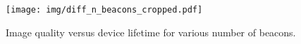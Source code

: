 \begin{figure}[!htb]
		\vspace{-1em}
	\begin{center}
		\texttt{[image: img/diff\_n\_beacons\_cropped.pdf]}
		\caption{Image quality versus device lifetime for various number of beacons.}
		\label{fig:n_beacons}
	\end{center}
\end{figure}
%
%
%
%
%
